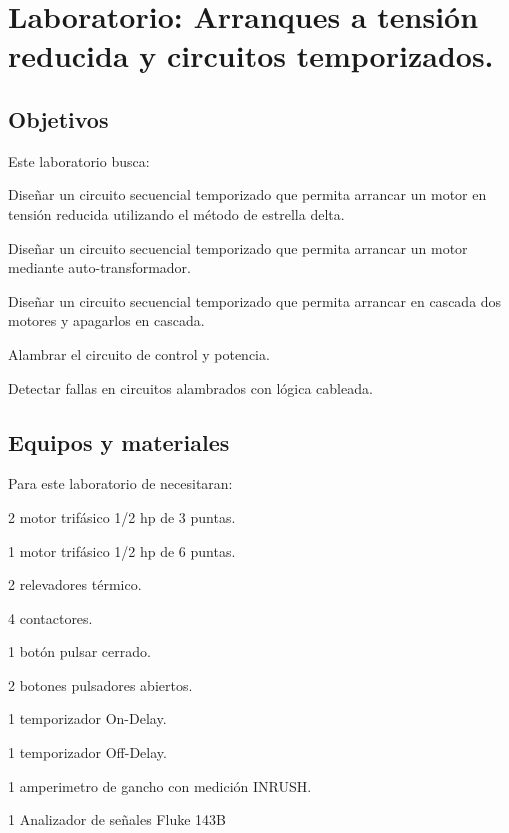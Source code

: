 

\chapter{Laboratorio:  Arranques a tensión reducida y circuitos temporizados.}

\section{Objetivos}
Este  laboratorio busca:
\begin{itemize}
	{\small
	 \item Diseñar un circuito secuencial temporizado que permita arrancar un motor en tensión reducida utilizando el método de estrella delta.
    \item  Diseñar un circuito secuencial temporizado que permita arrancar un motor mediante auto-transformador.
    \item  Diseñar un circuito secuencial temporizado que permita arrancar en cascada dos motores y apagarlos en cascada. 
	 \item Alambrar el circuito de control y potencia.
	 \item Detectar fallas en circuitos alambrados con lógica cableada.
	 
 }
\end{itemize} 

 
\section{Equipos y materiales}
Para este laboratorio de necesitaran:
\begin{itemize}
	{\small \item 2 motor trifásico 1/2 hp de 3 puntas.
	\item 1 motor trifásico 1/2 hp de 6 puntas.
	\item 2 relevadores térmico.
	\item 4 contactores.
	\item 1 botón pulsar cerrado.
	\item 2 botones pulsadores abiertos.
	\item 1 temporizador On-Delay.
	\item 1 temporizador Off-Delay.
	\item 1 amperimetro de gancho con medición INRUSH.
	\item 1 Analizador de señales Fluke 143B
}
\end{itemize}

